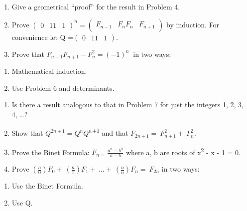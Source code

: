 \documentclass[10pt,letter]{article}
\begin{document}
\begin{enumerate}
\def\labelenumi{\arabic{enumi}.}

\item
  Give a geometrical ``proof'' for the result in Problem 4.
\item
  Prove \(

\begin{pmatrix}
  0 & 1 
  1 & 1 
  \end{pmatrix}
^{n} =

\begin{pmatrix}
  F_{n - 1} & F_{n} 
  F_{n} & F_{n + 1} 
  \end{pmatrix}
\) by induction. For convenience let Q =\(

\begin{pmatrix}
  0 & 1 
  1 & 1 
  \end{pmatrix}
\).
\item
  Prove that \(F_{n - 1}F_{n + 1} - F_{n}^{2} = {( - 1)}^{n}\ \) in two
  ways:

\end{enumerate}

\begin{enumerate}
\def\labelenumi{(\alph{enumi})}

\item
  Mathematical induction.
\item
  Use Problem 6 and determinants.

\end{enumerate}

\begin{enumerate}
\def\labelenumi{\arabic{enumi}.}

\item
  Is there a result analogous to that in Problem 7 for just the integers
  1, 2, 3, 4, \ldots{}?
\item
  Show that \(Q^{2n + 1} = Q^{n}Q^{n}\)\textsuperscript{+1} and that
  \(F_{2n + 1} = \ F_{n + 1}^{2} + \ F_{n}^{2}\).
\item
  Prove the Binet Formula: \(F_{n = \ }\frac{a^{n} - b^{n}}{a - b}\)
  where a, b are roots of x\textsuperscript{2} - x - 1 = 0.
\item
  Prove
  \(\left( \frac{n}{0} \right)F_{0} + \ \left( \frac{n}{1} \right)F_{1} + \ \ldots + \ \left( \frac{n}{n} \right)F_{n} = \ F_{2n}\)
  in two ways:

\end{enumerate}

\begin{enumerate}
\def\labelenumi{(\alph{enumi})}

\item
  Use the Binet Formula.
\item
  Use Q.

\end{enumerate}
\end{document}
